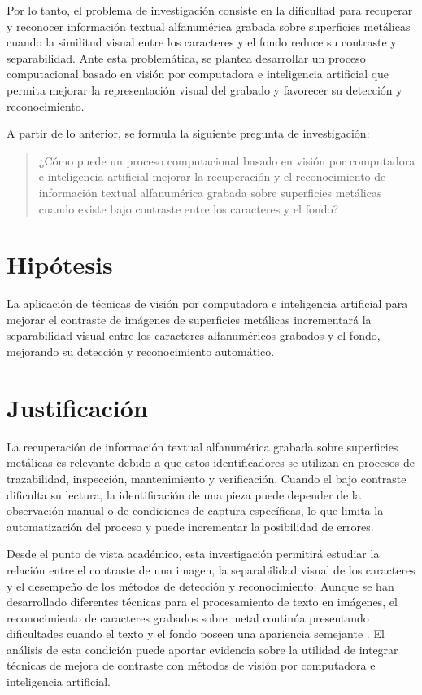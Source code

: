 Por lo tanto, el problema de investigación consiste en la dificultad para recuperar y reconocer información textual alfanumérica grabada sobre superficies metálicas cuando la similitud visual entre los caracteres y el fondo reduce su contraste y separabilidad. Ante esta problemática, se plantea desarrollar un proceso computacional basado en visión por computadora e inteligencia artificial que permita mejorar la representación visual del grabado y favorecer su detección y reconocimiento.

A partir de lo anterior, se formula la siguiente pregunta de investigación:

\begin{quote}
    ¿Cómo puede un proceso computacional basado en visión por computadora e inteligencia artificial mejorar la recuperación y el reconocimiento de información textual alfanumérica grabada sobre superficies metálicas cuando existe bajo contraste entre los caracteres y el fondo?
\end{quote}

\section{Hipótesis}
\label{sec:hipotesis}

La aplicación de técnicas de visión por computadora e inteligencia artificial para mejorar el contraste de imágenes de superficies metálicas incrementará la separabilidad visual entre los caracteres alfanuméricos grabados y el fondo, mejorando su detección y reconocimiento automático.

\section{Justificación}
\label{sec:justificacion}

La recuperación de información textual alfanumérica grabada sobre superficies metálicas es relevante debido a que estos identificadores se utilizan en procesos de trazabilidad, inspección, mantenimiento y verificación. Cuando el bajo contraste dificulta su lectura, la identificación de una pieza puede depender de la observación manual o de condiciones de captura específicas, lo que limita la automatización del proceso y puede incrementar la posibilidad de errores.

Desde el punto de vista académico, esta investigación permitirá estudiar la relación entre el contraste de una imagen, la separabilidad visual de los caracteres y el desempeño de los métodos de detección y reconocimiento. Aunque se han desarrollado diferentes técnicas para el procesamiento de texto en imágenes, el reconocimiento de caracteres grabados sobre metal continúa presentando dificultades cuando el texto y el fondo poseen una apariencia semejante \parencite{Pal2024,Xiang2018,Yasak2020}. El análisis de esta condición puede aportar evidencia sobre la utilidad de integrar técnicas de mejora de contraste con métodos de visión por computadora e inteligencia artificial.

